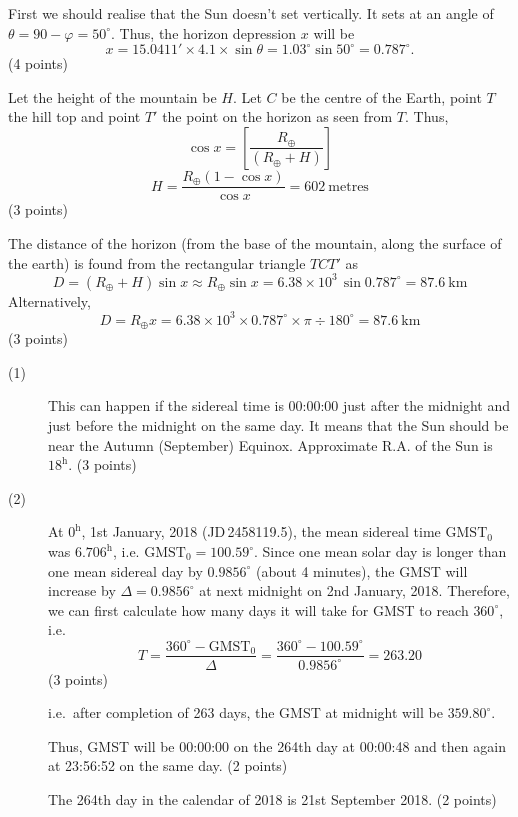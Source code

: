 First we should realise that the Sun doesn't set vertically. It sets at an
angle of $\theta = 90 - \varphi = 50^\circ$. Thus, the horizon depression
$x$ will be
\[ x = 15.0411' \times 4.1 \times \sin\theta
   = 1.03^\circ \sin 50^\circ = 0.787^\circ. \]
\hfill(4 points)

Let the height of the mountain be $H$. Let $C$ be the centre of the Earth,
point $T$ the hill top and point $T'$ the point on the horizon as seen from
$T$. Thus,
\[ \cos x = \left[\frac{R_\oplus}{(R_\oplus + H)}\right] \]
\[ H = \frac{R_\oplus(1 - \cos x)}{\cos x} = 602\ \mathrm{metres} \]
\hfill(3 points)

The distance of the horizon (from the base of the mountain, along the
surface of the earth) is found from the rectangular triangle $TCT'$ as
\[ D = (R_\oplus + H)\sin x \approx R_\oplus\sin x
   = 6.38\times 10^{3}\,\sin 0.787^\circ = 87.6\ \mathrm{km} \]
Alternatively,
\[ D = R_\oplus x = 6.38\times 10^{3}\times 0.787^\circ\times\pi
   \div 180^\circ = 87.6\ \mathrm{km} \]
\hfill(3 points)

\begin{description}
\item[(1)] This can happen if the sidereal time is 00:00:00 just after the
  midnight and just before the midnight on the same day. It means that the Sun
  should be near the Autumn (September) Equinox. Approximate R.A. of the Sun is
  $18^{\mathrm{h}}$.
  \hfill(3 points)
\item[(2)] At $0^{\mathrm{h}}$, 1st January, 2018 (JD\,2458119.5), the mean
  sidereal time $\mathrm{GMST}_0$ was $6.706^{\mathrm{h}}$, i.e.
  $\mathrm{GMST}_0 = 100.59^\circ$. Since one mean solar day is longer than one
  mean sidereal day by $0.9856^\circ$ (about 4 minutes), the GMST will increase
  by $\Delta = 0.9856^\circ$ at next midnight on 2nd January, 2018. Therefore,
  we can first calculate how many days it will take for GMST to reach
  $360^\circ$, i.e.
  \[
    T = \frac{360^\circ - \mathrm{GMST}_0}{\Delta}
      = \frac{360^\circ - 100.59^\circ}{0.9856^\circ} = 263.20
  \]
  \hfill(3 points)

  i.e.\ after completion of 263 days, the GMST at midnight will be
  $359.80^\circ$.

  Thus, GMST will be 00:00:00 on the 264th day at 00:00:48 and then again at
  23:56:52 on the same day. \hfill(2 points)

  The 264th day in the calendar of 2018 is 21st September 2018.
  \hfill(2 points)
\end{description}

